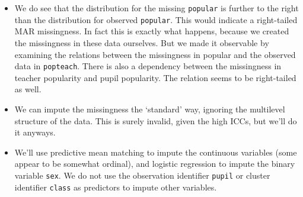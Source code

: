 \documentclass[
]{jss}
\begin{document}
\begin{itemize}
\item
  We do see that the distribution for the missing \texttt{popular} is
  further to the right than the distribution for observed
  \texttt{popular}. This would indicate a right-tailed MAR missingness.
  In fact this is exactly what happens, because we created the
  missingness in these data ourselves. But we made it observable by
  examining the relations between the missingness in popular and the
  observed data in \texttt{popteach}. There is also a dependency between
  the missingness in teacher popularity and pupil popularity. The
  relation seems to be right-tailed as well.
\item
  We can impute the missingness the `standard' way, ignoring the
  multilevel structure of the data. This is surely invalid, given the
  high ICCs, but we'll do it anyways.
\item
  We'll use predictive mean matching to impute the continuous variables
  (some appear to be somewhat ordinal), and logistic regression to
  impute the binary variable \texttt{sex}. We do not use the observation
  identifier \texttt{pupil} or cluster identifier \texttt{class} as
  predictors to impute other variables.
\end{itemize}
\end{document}
